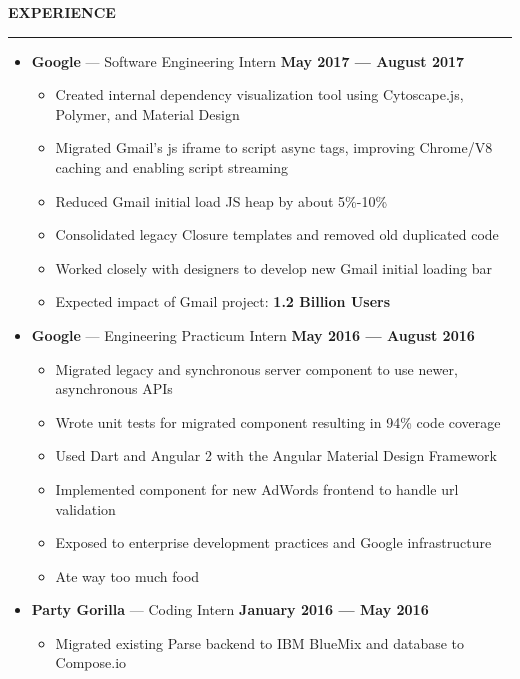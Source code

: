 \documentclass[10pt, oneside]{letter}
\newcommand{\linespaceshit} {
  \vspace{0.05in}
  \hrule
  \vspace{0.05in}
}
\newcommand{\textapprox}{\raisebox{0.5ex}{\texttildelow}}
\begin{document}
  \textbf{EXPERIENCE}
  \linespaceshit
    \begin{adjustwidth}{0.1in}{0pt}

      \begin{itemize}
        \item
          \textbf{Google} --- Software Engineering Intern \hfill  \textbf{May 2017 --- August 2017}
            \begin{itemize}
              \item Created internal dependency visualization tool using Cytoscape.js, Polymer, and Material Design
              \item Migrated Gmail's js iframe to script async tags, improving Chrome/V8 caching and enabling script streaming
              \item Reduced Gmail initial load JS heap by about 5\%-10\%
              \item Consolidated legacy Closure templates and removed old duplicated code
              \item Worked closely with designers to develop new Gmail initial loading bar
              \item Expected impact of Gmail project: \textbf{\textapprox 1.2 Billion Users}
            \end{itemize}
        \item
          \textbf{Google} --- Engineering Practicum Intern \hfill  \textbf{May 2016 --- August 2016}
            \begin{itemize}
              \item Migrated legacy and synchronous server component to use newer, asynchronous APIs
              \item Wrote unit tests for migrated component resulting in 94\% code coverage
              \item Used Dart and Angular 2 with the Angular Material Design Framework
              \item Implemented component for new AdWords frontend to handle url validation
              \item Exposed to enterprise development practices and Google infrastructure
              \item Ate way too much food
            \end{itemize}
        \item
          \textbf{Party Gorilla} --- Coding Intern \hfill \textbf{January 2016 --- May 2016}
            \begin{itemize}
              \item Migrated existing Parse backend to IBM BlueMix and database to Compose.io

\end{itemize}
\end{itemize}
\end{adjustwidth}
\end{document}
